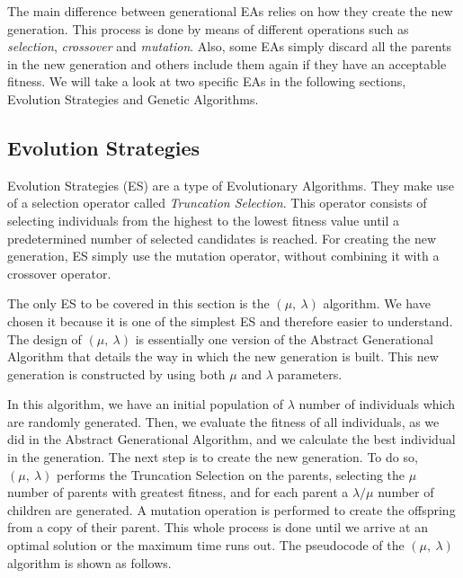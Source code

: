 The main difference between generational EAs relies on how they create the new generation. This process is done by means of different operations such as \textit{selection}, \textit{crossover} and \textit{mutation}. Also, some EAs simply discard all the parents in the new generation and others include them again if they have an acceptable fitness. We will take a look at two specific EAs in the following sections, Evolution Strategies and Genetic Algorithms.


\subsection{Evolution Strategies}

Evolution Strategies (ES) \cite{luke13metaheuristics} are a type of Evolutionary Algorithms. They make use of a selection operator called \textit{Truncation Selection}. This operator consists of selecting individuals from the highest to the lowest fitness value until a predetermined number of selected candidates is reached. For creating the new generation, ES simply use the mutation operator, without combining it with a crossover operator.

The only ES to be covered in this section is the $(\mu,\ \lambda)$ algorithm. We have chosen it because it is one of the simplest ES and therefore easier to understand. The design of $(\mu,\ \lambda)$ is essentially one version of the Abstract Generational Algorithm that details the way in which the new generation is built. This new generation is constructed by using both $\mu$ and $\lambda$ parameters.

In this algorithm, we have an initial population of $\lambda$ number of individuals which are randomly generated. Then, we evaluate the fitness of all individuals, as we did in the Abstract Generational Algorithm, and we calculate the best individual in the generation. The next step is to create the new generation. To do so, $(\mu,\ \lambda)$ performs the Truncation Selection on the parents, selecting the $\mu$ number of parents with greatest fitness, and for each parent a $\lambda / \mu$ number of children are generated. A mutation operation is performed to create the offspring from a copy of their parent. This whole process is done until we arrive at an optimal solution or the maximum time runs out. The pseudocode of the $(\mu,\ \lambda)$ algorithm is shown as follows.

